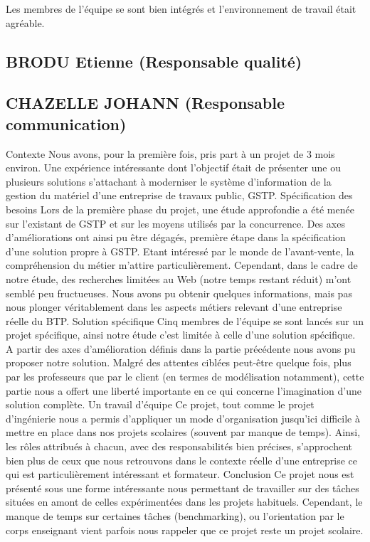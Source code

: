 Les membres de l'équipe se sont bien intégrés et l'environnement de travail était agréable.

       \subsection{BRODU Etienne (Responsable qualité)}

       \subsection{CHAZELLE JOHANN (Responsable communication)}

Contexte
Nous avons, pour la première fois, pris part à un projet de 3 mois environ. Une expérience intéressante dont l’objectif était de présenter une ou plusieurs solutions s’attachant à moderniser le système d’information de la gestion du matériel d’une entreprise de travaux public, GSTP.
Spécification des besoins
Lors de la première phase du projet, une étude approfondie a été menée sur l’existant de GSTP et sur les moyens utilisés par la concurrence. Des axes d’améliorations ont ainsi pu être dégagés, première étape dans la spécification d’une solution propre à GSTP.
Etant intéressé par le monde de l’avant-vente, la compréhension du métier m’attire particulièrement. Cependant, dans le cadre de notre étude, des recherches limitées au Web (notre temps restant réduit) m’ont semblé peu fructueuses. Nous avons pu obtenir quelques informations, mais pas nous plonger véritablement dans les aspects métiers relevant d’une entreprise réelle du BTP.
Solution spécifique
Cinq membres de l’équipe se sont lancés sur un projet spécifique, ainsi notre étude c’est limitée à celle d’une solution spécifique. A partir des axes d’amélioration définis dans la partie précédente nous avons pu proposer notre solution.
Malgré des attentes ciblées peut-être quelque fois, plus par les professeurs que par le client (en termes de modélisation notamment), cette partie nous a offert une liberté importante en ce qui concerne l’imagination d’une solution complète.
Un travail d’équipe
Ce projet, tout comme le projet d’ingénierie nous a permis d’appliquer un mode d’organisation jusqu’ici difficile à mettre en place dans nos projets scolaires (souvent par manque de temps). Ainsi, les rôles attribués à chacun, avec des responsabilités bien précises, s’approchent bien plus de ceux que nous retrouvons dans le contexte réelle d’une entreprise ce qui est particulièrement intéressant et formateur.
Conclusion
Ce projet nous est présenté sous une forme intéressante nous permettant de travailler sur des tâches situées en amont de celles expérimentées dans les projets habituels. Cependant, le manque de temps sur certaines tâches (benchmarking), ou l’orientation par le corps enseignant vient parfois nous rappeler que ce projet reste un projet scolaire.


